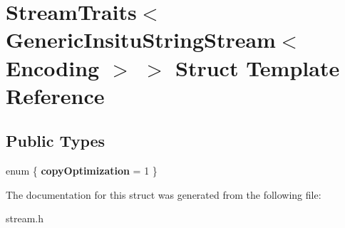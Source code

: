 \hypertarget{a00289}{}\section{Stream\+Traits$<$ Generic\+Insitu\+String\+Stream$<$ Encoding $>$ $>$ Struct Template Reference}
\label{a00289}
\subsection*{Public Types}
\begin{DoxyCompactItemize}
\item 
enum \{ {\bfseries copy\+Optimization} = 1
 \}\hypertarget{a00289_a4d3f346ea93c1397e3a995d38fdae4f6}{}\label{a00289_a4d3f346ea93c1397e3a995d38fdae4f6}

\end{DoxyCompactItemize}


The documentation for this struct was generated from the following file\+:\begin{DoxyCompactItemize}
\item 
stream.\+h\end{DoxyCompactItemize}
